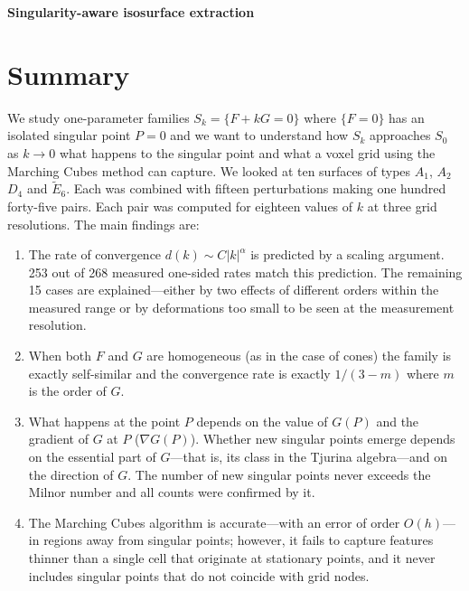 \documentclass[11pt, a4paper]{article}
\theoremstyle{plain}
\theoremstyle{definition}
\theoremstyle{remark}
\theoremstyle{definition}
\def\skola{Comenius University in Bratislava}  %
\def\fakulta{Faculty of Mathematics, Physics and Informatics} %
\def\autor{Lucia Držková} %
\begin{document}
\begin{center}
{\Large\bfseries Singularity-aware isosurface extraction}\\[6pt]
\end{center}

\section*{Summary}

We study one-parameter families $S_k=\{F+kG=0\}$ where $\{F=0\}$ has an isolated singular point $P=0$ and we want to understand how $S_k$ approaches $S_0$ as $k\to0$ what happens to the singular point and what a voxel grid using the Marching Cubes method can capture. We looked at ten surfaces of types $A_1$, $A_2$ $D_4$ and $\tilde E_6$. Each was combined with fifteen perturbations making one hundred forty-five pairs. Each pair was computed for eighteen values of $k$ at three grid resolutions. The main findings are:
\begin{enumerate}
\item The rate of convergence $d(k)\sim C|k|^\alpha$ is predicted by a scaling argument. 253 out of 268 measured one-sided rates match this prediction. The remaining 15 cases are explained—either by two effects of different orders within the measured range or by deformations too small to be seen at the measurement resolution.

\item When both $F$ and $G$ are homogeneous (as in the case of cones) the family is exactly self-similar and the convergence rate is exactly $1/(3-m)$ where $m$ is the order of $G$.

\item What happens at the point $P$ depends on the value of $G(P)$ and the gradient of $G$ at $P$ ($\nabla G(P)$). Whether new singular points emerge depends on the essential part of $G$—that is, its class in the Tjurina algebra—and on the direction of $G$. The number of new singular points never exceeds the Milnor number and all counts were confirmed by it.

\item The Marching Cubes algorithm is accurate—with an error of order $O(h)$—in regions away from singular points; however, it fails to capture features thinner than a single cell that originate at stationary points, and it never includes singular points that do not coincide with grid nodes.

\end{enumerate}
\end{document}
